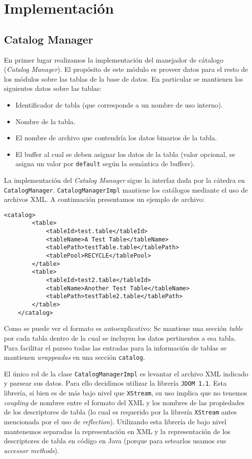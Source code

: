 \section{Implementaci\'on}

\subsection{Catalog Manager}

En primer lugar realizamos la implementaci\'on del manejador de c\'atalogo (\textit{Catalog Manager}). El propósito de este módulo es proveer datos para el resto de los módulos sobre las tablas de la base de datos. En particular se mantienen los siguientes datos sobre las tablas:

\begin{itemize}
	\item Identificador de tabla (que corresponde a un nombre de uso interno).
	\item Nombre de la tabla.
	\item El nombre de archivo que contendría los datos binarios de la tabla.
	\item El buffer al cual se deben asignar los datos de la tabla (valor opcional, se asigna un valor
	por \texttt{default} seg\'un la sem\'antica de buffers). 
\end{itemize}

La implementaci\'on del \textit{Catalog Manager} sigue la interfaz dada por la c\'atedra en \texttt{CatalogManager}. \texttt{CatalogManagerImpl} mantiene los cat\'alogos mediante el uso de archivos XML. A continuaci\'on presentamos un ejemplo de archivo:

\begin{Verbatim}[xleftmargin=-3em]
	<catalog>
		<table>
			<tableId>test.table</tableId>
			<tableName>A Test Table</tableName>
			<tablePath>testTable.table</tablePath>
			<tablePool>RECYCLE</tablePool>
		</table>
		<table>
			<tableId>test2.table</tableId>
			<tableName>Another Test Table</tableName>
			<tablePath>testTable2.table</tablePath>
		</table>
	</catalog>
\end{Verbatim}

Como se puede ver el formato es autoexplicativo: Se mantiene una secci\'on \textit{table} por cada tabla dentro de la cual se incluyen los datos pertinentes a esa tabla. Para facilitar el parseo todas las entradas para la informaci\'on de tablas se mantienen \textit{wrappeadas} en una secci\'on \texttt{catalog}.

El único rol de la clase \texttt{CatalogManagerImpl} es levantar el archivo XML indicado y parsear sus datos. Para ello decidimos utilizar la librer\'ia \texttt{JDOM 1.1}. Esta librer\'ia, si bien es de m\'as bajo nivel que \texttt{XStream}, su uso implica que no tenemos \textit{coupling} de nombres entre el formato del XML y los nombres de las propiedades de los descriptores de tabla (lo cual es requerido por la librer\'ia \texttt{XStream} antes mencionada por el uso de  \textit{reflection}). Utilizando esta librer\'ia de bajo nivel mantenemos separadas la representaci\'on en XML y la representaci\'on de los descriptores de tabla en c\'odigo en Java (porque para setearlos usamos sus \textit{accessor methods}).

